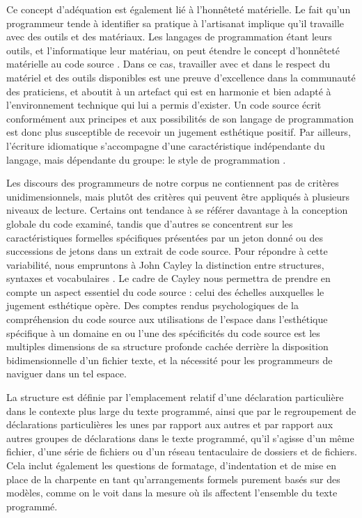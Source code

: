 \documentclass{article}
\begin{document}
Ce concept d'adéquation est également lié à l'honnêteté matérielle. Le fait qu'un programmeur tende à identifier sa pratique à l'artisanat implique qu'il travaille avec des outils et des matériaux. Les langages de programmation étant leurs outils, et l'informatique leur matériau, on peut étendre le concept d'honnêteté matérielle au code source \citep{sennett_craftsman_2009}. Dans ce cas, travailler avec et dans le respect du matériel et des outils disponibles est une preuve d'excellence dans la communauté des praticiens, et aboutit à un artefact qui est en harmonie et bien adapté à l'environnement technique qui lui a permis d'exister. Un code source écrit conformément aux principes et aux possibilités de son langage de programmation est donc plus susceptible de recevoir un jugement esthétique positif. Par ailleurs, l'écriture idiomatique s'accompagne d'une caractéristique indépendante du langage, mais dépendante du groupe: le style de programmation \citep{depaz_discursive_2022}.

Les discours des programmeurs de notre corpus ne contiennent pas de critères unidimensionnels, mais plutôt des critères qui peuvent être appliqués à plusieurs niveaux de lecture. Certains ont tendance à se référer davantage à la conception globale du code examiné, tandis que d'autres se concentrent sur les caractéristiques formelles spécifiques présentées par un jeton donné ou des successions de jetons dans un extrait de code source. Pour répondre à cette variabilité, nous empruntons à John Cayley la distinction entre structures, syntaxes et vocabulaires \citep{cayley_code_2012}.  Le cadre de Cayley nous permettra de prendre en compte un aspect essentiel du code source : celui des échelles auxquelles le jugement esthétique opère. Des comptes rendus psychologiques de la compréhension du code source aux utilisations de l'espace dans l'esthétique spécifique à un domaine en ou l'une des spécificités du code source est les multiples dimensions de sa structure profonde cachée derrière la disposition bidimensionnelle d'un fichier texte, et la nécessité pour les programmeurs de naviguer dans un tel espace.

La structure est définie par l'emplacement relatif d'une déclaration particulière dans le contexte plus large du texte programmé, ainsi que par le regroupement de déclarations particulières les unes par rapport aux autres et par rapport aux autres groupes de déclarations dans le texte programmé, qu'il s'agisse d'un même fichier, d'une série de fichiers ou d'un réseau tentaculaire de dossiers et de fichiers. Cela inclut également les questions de formatage, d'indentation et de mise en place de la charpente en tant qu'arrangements formels purement basés sur des modèles, comme on le voit dans la mesure où ils affectent l'ensemble du texte programmé.
\end{document}

